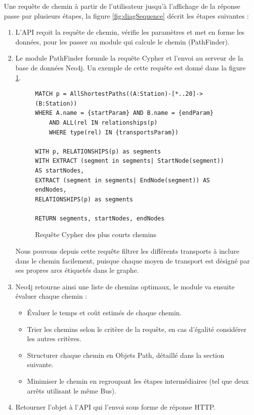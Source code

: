 Une requête de chemin à partir de l'utilisateur jusqu'à l'affichage de la réponse passe par plusieurs étapes, la figure \ref{fig:diagSequence} décrit les étapes suivantes :


\begin{enumerate}
	\item L'API reçoit la requête de chemin, vérifie les paramètres et met en forme les données, pour les passer au module qui calcule le chemin (PathFinder).
	\item Le module PathFinder formule la requête Cypher et l'envoi au serveur de la base de données Neo4j.
	      Un exemple de cette requête est donné dans la figure \ref{fig:cipherRequest}.
\begin{figure}[h!]
	      \begin{lstlisting}[style=cypher]
MATCH p = AllShortestPaths((A:Station)-[*..20]->(B:Station))
WHERE A.name = {startParam} AND B.name = {endParam}
	AND ALL(rel IN relationships(p) 
	WHERE type(rel) IN {transportsParam})

WITH p, RELATIONSHIPS(p) as segments
WITH EXTRACT (segment in segments| StartNode(segment)) AS startNodes,
EXTRACT (segment in segments| EndNode(segment)) AS endNodes,
RELATIONSHIPS(p) as segments
            
RETURN segments, startNodes, endNodes
	      \end{lstlisting}
\caption{Requête Cypher des plus courts chemins}
\label{fig:cipherRequest}
\end{figure}
	      Nous pouvons depuis cette requête filtrer les différents transports à inclure dans le chemin facilement, puisque chaque moyen de transport est désigné par ses propres arcs étiquetés dans le graphe.
	\item Neo4j retourne ainsi une liste de chemins optimaux, le module va ensuite évaluer chaque chemin :
	      \begin{itemize}
	      	\item Évaluer le temps et coût estimés de chaque chemin.
	      	\item Trier les chemins selon le critère de la requête, en cas d'égalité considérer les autres critères.
	      	\item Structurer chaque chemin en Objets Path, détaillé dans la section suivante.
	      	\item Minimiser le chemin en regroupant les étapes intermédiaires (tel que deux arrêts utilisant le même Bus).
	      \end{itemize}
	\item Retourner l'objet à l'API qui l'envoi sous forme de réponse HTTP.
\end{enumerate}
\label{SectionPathFinding}
	
